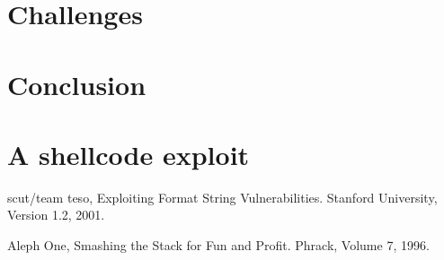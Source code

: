 \documentclass[12pt]{article}
\begin{document}
\section{Challenges}

\section{Conclusion}

\appendix
\section{A shellcode exploit}

\begin{thebibliography}{9}

  scut/team teso,
  Exploiting Format String Vulnerabilities.
  Stanford University,
  Version 1.2,
  2001.

  Aleph One,
  Smashing the Stack for Fun and Profit.
  Phrack,
  Volume 7,
  1996.
\end{thebibliography}
\end{document}
